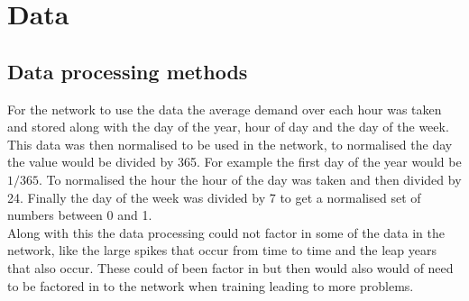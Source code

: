 \documentclass{IEEEtran}[11pt]
\begin{document}
\section{Data}
\subsection{Data processing methods}
\begin{flushleft}
  For the network to use the data the average demand over each hour was taken and stored
  along with the day of the year, hour of day and the day of the week. This data was then
  normalised to be used in the network, to normalised the day the value would be divided by
  365. For example the first day of the year would be $1 / 365$. To normalised the hour the
  hour of the day was taken and then divided by 24. Finally the day of the week was divided
  by 7 to get a normalised set of numbers between 0 and 1.
  \\
  \vspace{1.5mm}
  Along with this the data processing could not factor in some of the data in the network, like
  the large spikes that occur from time to time and the leap years that also occur. These could
  of been factor in but then would also would of need to be factored in to the network when training
  leading to more problems.
\end{flushleft}
\end{document}
